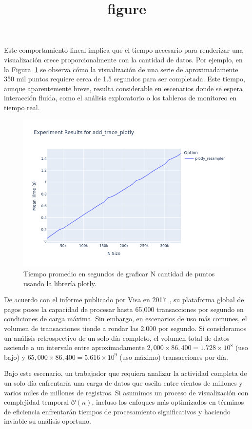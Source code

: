 Este comportamiento lineal implica que el tiempo necesario para renderizar una visualización crece proporcionalmente con la cantidad de datos. Por ejemplo, en la Figura~\ref{add_trace_plotly} se observa cómo la visualización de una serie de aproximadamente 350 mil puntos requiere cerca de 1.5 segundos para ser completada. Este tiempo, aunque aparentemente breve, resulta considerable en escenarios donde se espera interacción fluida, como el análisis exploratorio o los tableros de monitoreo en tiempo real.

\begin{figure}
    \centering
    \includegraphics[width=0.9\linewidth]{introduction/images/add_trace_plotly.png}
    \title{figure}
    \caption[Tiempo Renderización Plotly]{Tiempo promedio en segundos de graficar N cantidad de puntos usando la librería plotly.}
    \label{add_trace_plotly}
\end{figure}

De acuerdo con el informe publicado por Visa en 2017~\cite{visa2017facts}, su plataforma global de pagos posee la capacidad de procesar hasta 65{,}000 transacciones por segundo en condiciones de carga máxima. Sin embargo, en escenarios de uso más comunes, el volumen de transacciones tiende a rondar las 2{,}000 por segundo. Si consideramos un análisis retrospectivo de un solo día completo, el volumen total de datos asciende a un intervalo entre aproximadamente \(2{,}000 \times 86{,}400 = 1.728 \times 10^8\) (uso bajo) y \(65{,}000 \times 86{,}400 = 5.616 \times 10^9\) (uso máximo) transacciones por día.

Bajo este escenario, un trabajador que requiera analizar la actividad completa de un solo día enfrentaría una carga de datos que oscila entre cientos de millones y varios miles de millones de registros. Si asumimos un proceso de visualización con complejidad temporal \(\mathcal{O}(n)\), incluso los enfoques más optimizados en términos de eficiencia enfrentarán tiempos de procesamiento significativos y haciendo inviable su análisis oportuno.

